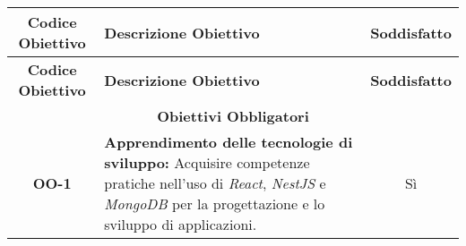 \begin{longtable}{|c|>{\centering\arraybackslash}p{}|c|} %
    \hline
    \rowcolor{green!30} %
    \textbf{Codice Obiettivo} & \textbf{Descrizione Obiettivo} & \textbf{Soddisfatto}\\
    \hline
    \endfirsthead %
    
    \hline
    \rowcolor{green!30} %
    \textbf{Codice Obiettivo} & \textbf{Descrizione Obiettivo} & \textbf{Soddisfatto}\\
    \hline
    \endhead %
    
    \hline
    \multicolumn{3}{|c|}{\rowcolor{green!30} \textbf{Obiettivi Obbligatori}}  \\
    \hline %
    \textbf{OO-1} & \textbf{Apprendimento delle tecnologie di sviluppo:} Acquisire competenze pratiche nell'uso di \textit{React}, \textit{NestJS} e \textit{MongoDB} per la progettazione e lo sviluppo di applicazioni. & Sì \\


\end{longtable}
